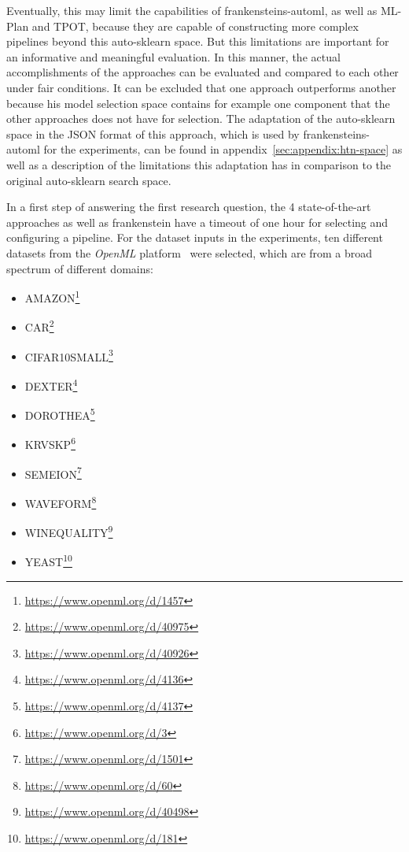 Eventually, this may limit the capabilities of frankensteins-automl, as well as ML-Plan and TPOT, because they are capable of constructing more complex pipelines beyond this auto-sklearn space.
But this limitations are important for an informative and meaningful evaluation.\newline
In this manner, the actual accomplishments of the approaches can be evaluated and compared to each other under fair conditions.
It can be excluded that one approach outperforms another because his model selection space contains for example one component that the other approaches does not have for selection.\newline
The adaptation of the auto-sklearn space in the JSON format of this approach, which is used by frankensteins-automl for the experiments, can be found in appendix~\ref{sec:appendix:htn-space} as well as a description of the limitations this adaptation has in comparison to the original auto-sklearn search space.

In a first step of answering the first research question, the 4 state-of-the-art approaches as well as frankenstein have a timeout of one hour for selecting and configuring a pipeline.
For the dataset inputs in the experiments, ten different datasets from the \textit{OpenML} platform~\cite{Vanschoren-OpenML} were selected, which are from a broad spectrum of different domains:
\begin{itemize}
    \item AMAZON\footnote{\url{https://www.openml.org/d/1457}}
    \item CAR\footnote{\url{https://www.openml.org/d/40975}}
    \item CIFAR10SMALL\footnote{\url{https://www.openml.org/d/40926}}
    \item DEXTER\footnote{\url{https://www.openml.org/d/4136}}
    \item DOROTHEA\footnote{\url{https://www.openml.org/d/4137}}
    \item KRVSKP\footnote{\url{https://www.openml.org/d/3}}
    \item SEMEION\footnote{\url{https://www.openml.org/d/1501}}
    \item WAVEFORM\footnote{\url{https://www.openml.org/d/60}}
    \item WINEQUALITY\footnote{\url{https://www.openml.org/d/40498}}
    \item YEAST\footnote{\url{https://www.openml.org/d/181}}
\end{itemize}

